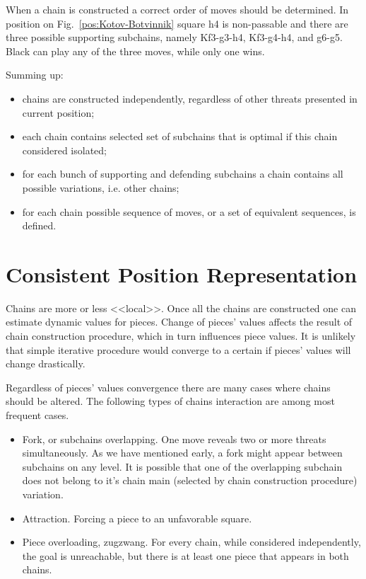\documentclass{llncs}
\begin{document}
When a chain is constructed a correct order of moves should be
determined.  In position on Fig.~\ref{pos:Kotov-Botvinnik} square h4
is non-passable and there are three possible supporting subchains,
namely Kf3-g3-h4, Kf3-g4-h4, and g6-g5. Black can play any of the
three moves, while only one wins.

Summing up:
\begin{itemize}
\item chains are constructed independently, regardless of other threats presented in current position;
\item each chain contains selected set of subchains that is optimal if this chain considered isolated;
\item for each bunch of supporting and defending subchains a chain contains all possible variations, i.e. other chains;
\item for each chain possible sequence of moves, or a set of equivalent sequences, is defined.
\end{itemize}


\section{Consistent Position Representation}
Chains are more or less <<local>>. Once all the chains are constructed
one can estimate dynamic values for pieces. Change of pieces' values
affects the result of chain construction procedure, which in turn
influences piece values. It is unlikely that simple iterative
procedure would converge to a certain if pieces' values will change
drastically.

Regardless of pieces' values convergence there are many cases where
chains should be altered. The following types of chains interaction
are among most frequent cases.
\begin{itemize}
\item Fork, or subchains overlapping. One move reveals two or more
  threats simultaneously. As we have mentioned early, a fork might
  appear between subchains on any level. It is possible that one of
  the overlapping subchain does not belong to it's chain main
  (selected by chain construction procedure) variation.
\item Attraction. Forcing a piece to an unfavorable square.
\item Piece overloading, zugzwang. For every chain, while considered
  independently, the goal is unreachable, but there is at least one
  piece that appears in both chains.
\end{itemize}
\end{document}
